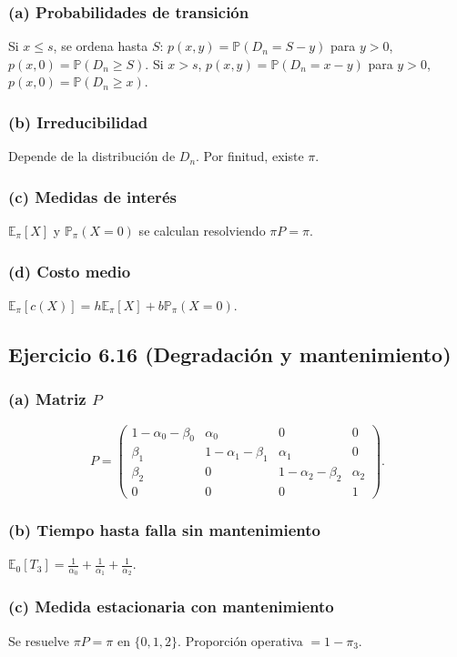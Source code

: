 \documentclass[letterpaper, 12pt]{article}
\newcommand{\E}{\mathbb{E}}
\renewcommand{\P}{\mathbb{P}}
\newcommand{\1}{\mathbbm{1}}
\begin{document}
    \subsubsection*{(a) Probabilidades de transici\'on}
    Si $x\le s$, se ordena hasta $S$: $p(x,y)=\P(D_n=S-y)$ para $y>0$, $p(x,0)=\P(D_n\ge S)$. Si $x>s$, $p(x,y)=\P(D_n=x-y)$ para $y>0$, $p(x,0)=\P(D_n\ge x)$.

    \subsubsection*{(b) Irreducibilidad}
    Depende de la distribuci\'on de $D_n$. Por finitud, existe $\pi$.

    \subsubsection*{(c) Medidas de inter\'es}
    $\E_\pi[X]$ y $\P_\pi(X=0)$ se calculan resolviendo $\pi P=\pi$.

    \subsubsection*{(d) Costo medio}
    $\E_\pi[c(X)]=h\E_\pi[X]+b\P_\pi(X=0)$.

    \subsection{Ejercicio 6.16 (Degradaci\'on y mantenimiento)}

    \subsubsection*{(a) Matriz $P$}
    \[
    P=\begin{pmatrix}
    1-\alpha_0-\beta_0 & \alpha_0 & 0 & 0\\
    \beta_1 & 1-\alpha_1-\beta_1 & \alpha_1 & 0\\
    \beta_2 & 0 & 1-\alpha_2-\beta_2 & \alpha_2\\
    0 & 0 & 0 & 1
    \end{pmatrix}.
    \]

    \subsubsection*{(b) Tiempo hasta falla sin mantenimiento}
    $\E_0[T_3]=\frac1{\alpha_0}+\frac1{\alpha_1}+\frac1{\alpha_2}$.

    \subsubsection*{(c) Medida estacionaria con mantenimiento}
    Se resuelve $\pi P=\pi$ en $\{0,1,2\}$. Proporci\'on operativa $=1-\pi_3$.
\end{document}
